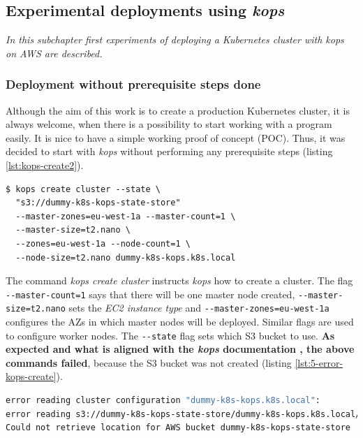 \subsection{Experimental deployments using \textit{kops}}
\textit{In this subchapter first experiments of deploying a Kubernetes cluster with \textit{kops} on AWS are described.}

\subsubsection{Deployment without prerequisite steps done}

Although the aim of this work is to create a production Kubernetes cluster, it is always welcome, when there is a possibility to start working with a program easily. It is nice to have a simple working proof of concept (POC). Thus, it was decided to start with \textit{kops} without performing any prerequisite steps (listing \ref{lst:kops-create2}).
\begin{mdframed}[linecolor=white]
\begin{lstlisting}[basicstyle=\scriptsize,caption={Command used to create a cluster with \textit{kops}, without prerequisite steps performed},label=lst:kops-create2]
$ kops create cluster --state \
  "s3://dummy-k8s-kops-state-store"
  --master-zones=eu-west-1a --master-count=1 \
  --master-size=t2.nano \
  --zones=eu-west-1a --node-count=1 \
  --node-size=t2.nano dummy-k8s-kops.k8s.local
\end{lstlisting}
\end{mdframed}

The command \textit{kops create cluster} instructs \textit{kops} how to create a cluster. The flag \verb|--master-count=1| says that there will be one master node created, \verb|--master-size=t2.nano| sets the \textit{EC2 instance type} and \verb|--master-zones=eu-west-1a| configures the AZs in which master nodes will be deployed. Similar flags are used to configure worker nodes. The \verb|--state| flag sets which S3 bucket to use.  \textbf{As expected and what is aligned with the \textit{kops} documentation \cite{online-kops-aws}, the above commands failed}, because the S3 bucket was not created (listing \ref{lst:5-error-kops-create}).
\begin{lstlisting}[basicstyle=\tiny,caption={Output of the commands used to create a cluster with \textit{kops}, without prerequisite steps performed},captionpos=b,language=Bash ,label=lst:5-error-kops-create]
error reading cluster configuration "dummy-k8s-kops.k8s.local":
error reading s3://dummy-k8s-kops-state-store/dummy-k8s-kops.k8s.local/config:
Could not retrieve location for AWS bucket dummy-k8s-kops-state-store
\end{lstlisting}

